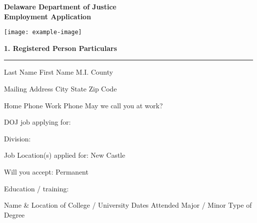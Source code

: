 \documentclass[12pt]{article}
\newcommand{\sectiontitle}[1]{{\large\textbf{#1}}\vspace{6pt}\hrule\vspace{6pt}}
\begin{document}
\noindent
\begin{minipage}[b]{0.75\textwidth}
    \Large{\textbf{Delaware Department of Justice}} \\
    \large{\textbf{Employment Application}}
\end{minipage}%
\begin{minipage}[b]{0.25\textwidth}
    \texttt{[image: example-image]} %
\end{minipage}

\sectiontitle{1. Registered Person Particulars}

Last Name \underline{\hspace{5cm}} First Name \underline{\hspace{5cm}} M.I. \underline{\hspace{1.5cm}} County \underline{\hspace{3.5cm}}

Mailing Address \underline{\hspace{5cm}} City \underline{\hspace{4.5cm}} State \underline{\hspace{0.5cm}} Zip Code \underline{\hspace{2.5cm}}

Home Phone \underline{\hspace{4.5cm}} Work Phone \underline{\hspace{4.5cm}} May we call you at work?  

DOJ job applying for: \underline{\hspace{5cm}}

Division: \underline{\hspace{5cm}}

Job Location(s) applied for: New Castle    

Will you accept: Permanent    

Education / training:  

Name \& Location of College / University \underline{\hspace{5cm}} Dates Attended \underline{\hspace{5cm}} Major / Minor \underline{\hspace{5cm}} Type of Degree \underline{\hspace{5cm}}
\end{document}
